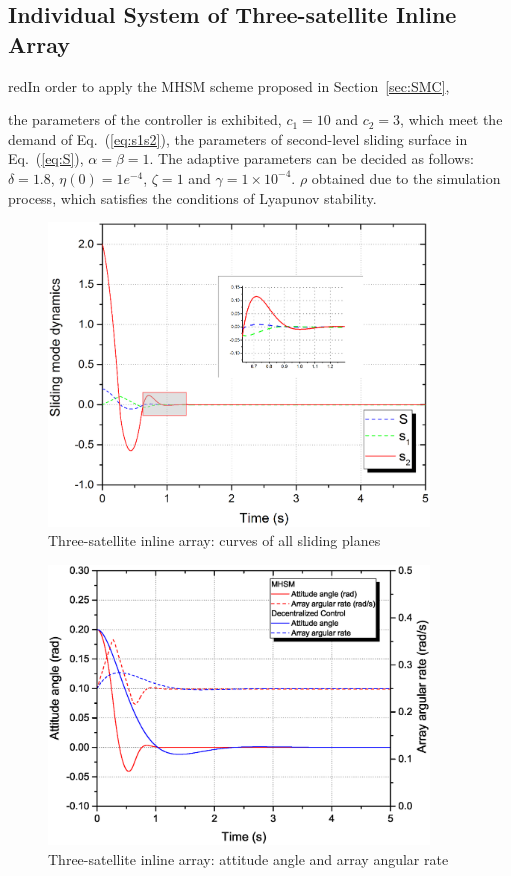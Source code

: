 \subsection{Individual System of Three-satellite Inline Array}
\begin{color}{red}In order to apply the MHSM scheme proposed in Section~\ref{sec:SMC},\end{color} the parameters of the controller is exhibited, $c_1 = 10$ and $c_2 = 3$, which meet the demand of Eq.~(\ref{eq:s1s2}), the parameters of second-level sliding surface in Eq.~(\ref{eq:S}), $\alpha=\beta=1$. The adaptive parameters can be decided as follows: $\delta = 1.8$, $\eta(0) = 1e^{-4}$, $\zeta = 1$ and $\gamma = 1\times 10^{-4}$. $\rho$ obtained due to the simulation process, which satisfies the conditions of Lyapunov stability.\par
\begin{figure}
\centering
\includegraphics[width=0.9\textwidth]{paper2_Fig5.eps}
\caption{Three-satellite inline array: curves of all sliding planes}
\label{Figure:sm}
\end{figure}
\begin{figure}
\centering
\includegraphics[width=0.9\textwidth]{paper2_Fig6.eps}
\caption{Three-satellite inline array: attitude angle and array angular rate}
\label{Figure:attitude}
\end{figure}
